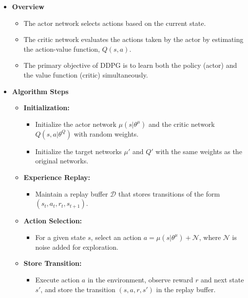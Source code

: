 \documentclass[letterpaper]{article}
\begin{document}
\begin{itemize}
    \item \textbf{Overview}
    \begin{itemize}
        \item The actor network selects actions based on the current state.
        \item The critic network evaluates the actions taken by the actor by estimating the action-value function, \(Q(s, a)\).
        \item The primary objective of DDPG is to learn both the policy (actor) and the value function (critic) simultaneously.
    \end{itemize}
\vspace{1em}
    \item \textbf{Algorithm Steps}
    \begin{itemize}
        \item \textbf{Initialization:} 
        \begin{itemize}
            \item Initialize the actor network \( \mu(s|\theta^\mu) \) and the critic network \( Q(s, a|\theta^Q) \) with random weights.
            \item Initialize the target networks \( \mu' \) and \( Q' \) with the same weights as the original networks.
        \end{itemize}

        \item \textbf{Experience Replay:}
        \begin{itemize}
            \item Maintain a replay buffer \( \mathcal{D} \) that stores transitions of the form \( (s_t, a_t, r_t, s_{t+1}) \).
        \end{itemize}

        \item \textbf{Action Selection:}
        \begin{itemize}
            \item For a given state \( s \), select an action \( a = \mu(s|\theta^\mu) + \mathcal{N} \), where \( \mathcal{N} \) is noise added for exploration.
        \end{itemize}

        \item \textbf{Store Transition:}
        \begin{itemize}
            \item Execute action \( a \) in the environment, observe reward \( r \) and next state \( s' \), and store the transition \( (s, a, r, s') \) in the replay buffer.
        \end{itemize}


\end{itemize}
\end{itemize}
\end{document}
